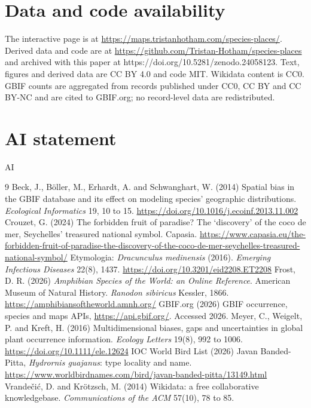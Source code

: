 \documentclass[11pt,a4paper]{article}
\begin{document}
\section*{Data and code availability}
The interactive page is at \url{https://maps.tristanhotham.com/species-places/}. Derived data and code are at \url{https://github.com/Tristan-Hotham/species-places} and archived with this paper at https://doi.org/10.5281/zenodo.24058123. Text, figures and derived data are CC BY 4.0 and code MIT. Wikidata content is CC0. GBIF counts are aggregated from records published under CC0, CC BY and CC BY-NC and are cited to GBIF.org; no record-level data are redistributed.

\section*{AI statement}
{{AI}}

\begin{thebibliography}{9}
 Beck, J., B\"oller, M., Erhardt, A. and Schwanghart, W. (2014) Spatial bias in the GBIF database and its effect on modeling species' geographic distributions. \textit{Ecological Informatics} 19, 10 to 15. \url{https://doi.org/10.1016/j.ecoinf.2013.11.002}
 Crouzet, G. (2024) The forbidden fruit of paradise? The `discovery' of the coco de mer, Seychelles' treasured national symbol. Capasia. \url{https://www.capasia.eu/the-forbidden-fruit-of-paradise-the-discovery-of-the-coco-de-mer-seychelles-treasured-national-symbol/}
 Etymologia: \textit{Dracunculus medinensis} (2016). \textit{Emerging Infectious Diseases} 22(8), 1437. \url{https://doi.org/10.3201/eid2208.ET2208}
 Frost, D. R. (2026) \textit{Amphibian Species of the World: an Online Reference}. American Museum of Natural History. \textit{Ranodon sibiricus} Kessler, 1866. \url{https://amphibiansoftheworld.amnh.org/}
 GBIF.org (2026) GBIF occurrence, species and maps APIs, \url{https://api.gbif.org/}. Accessed 2026.
 Meyer, C., Weigelt, P. and Kreft, H. (2016) Multidimensional biases, gaps and uncertainties in global plant occurrence information. \textit{Ecology Letters} 19(8), 992 to 1006. \url{https://doi.org/10.1111/ele.12624}
 IOC World Bird List (2026) Javan Banded-Pitta, \textit{Hydrornis guajanus}: type locality and name. \url{https://www.worldbirdnames.com/bird/javan-banded-pitta/13149.html}
 Vrande\v{c}i\'c, D. and Kr\"otzsch, M. (2014) Wikidata: a free collaborative knowledgebase. \textit{Communications of the ACM} 57(10), 78 to 85.
\end{thebibliography}
\end{document}
